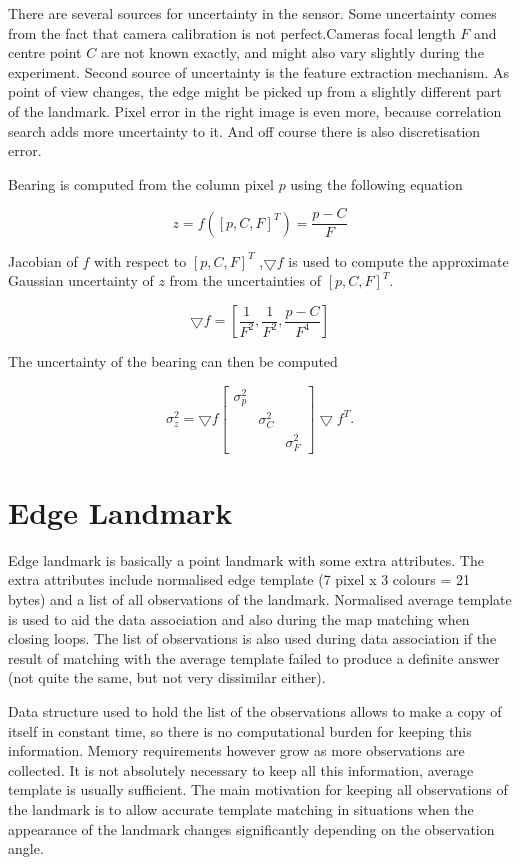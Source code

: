 There are several sources for uncertainty in the sensor. Some
uncertainty comes from the fact that camera calibration is not
perfect.Cameras focal length $F$ and centre point $C$ are not known
exactly, and might also vary slightly during the experiment. Second
source of uncertainty is the feature extraction mechanism. As point of
view changes, the edge might be picked up from a slightly different
part of the landmark. Pixel error in the right image is even more,
because correlation search adds more uncertainty to it. And off course
there is also discretisation error.

Bearing is computed from the column pixel $p$ using the following equation

$$
z = f([p,C,F]^T) = \frac{p - C}{F}
$$

Jacobian of $f$ with respect to $[p,C,F]^T$ ,$\bigtriangledown f$ is used to compute the
approximate Gaussian uncertainty of $z$ from the uncertainties of
$[p,C,F]^T$.

$$
\bigtriangledown f = \left[ 
\frac{1}{F^2},
\frac{1}{F^2},
\frac{p - C}{F^4}
\right]
$$

The uncertainty of the bearing can then be computed

$$
\sigma^2_z = \bigtriangledown f \left[ \begin{array}{ccc}
      \sigma^2_p & & \\
   &  \sigma^2_C & \\
  & & \sigma^2_F 
\end{array} \right] \bigtriangledown f^T.
$$



\section{Edge Landmark}

Edge landmark is basically a point landmark with some extra
attributes. The extra attributes include normalised edge template (7
pixel x 3 colours = 21 bytes) and a list of all observations of the
landmark.  Normalised average template is used to aid the data
association and also during the map matching when closing loops. The
list of observations is also used during data association if the
result of matching with the average template failed to produce a
definite answer (not quite the same, but not very dissimilar
either). 

Data structure used to hold the list of the observations allows to
make a copy of itself in constant time, so there is no computational
burden for keeping this information. Memory requirements however grow
as more observations are collected. It is not absolutely necessary to
keep all this information, average template is usually sufficient. The
main motivation for keeping all observations of the landmark is to
allow accurate template matching in situations when the appearance of
the landmark changes significantly depending on the observation angle.

